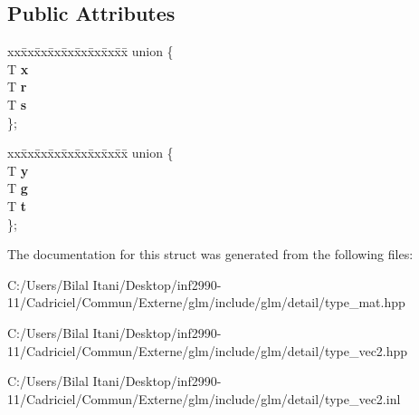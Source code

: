 \subsection*{Public Attributes}
\begin{DoxyCompactItemize}
\item 
\begin{tabbing}
xx\=xx\=xx\=xx\=xx\=xx\=xx\=xx\=xx\=\kill
union \{\\
\>T {\bfseries x}\\
\>T {\bfseries r}\\
\>T {\bfseries s}\\
\}; \hypertarget{structglm_1_1detail_1_1tvec2_afd7f3368f7e15406737f8fdcfa9a5ff3}{}\label{structglm_1_1detail_1_1tvec2_afd7f3368f7e15406737f8fdcfa9a5ff3}
\\

\end{tabbing}\item 
\begin{tabbing}
xx\=xx\=xx\=xx\=xx\=xx\=xx\=xx\=xx\=\kill
union \{\\
\>T {\bfseries y}\\
\>T {\bfseries g}\\
\>T {\bfseries t}\\
\}; \hypertarget{structglm_1_1detail_1_1tvec2_a21627d4405094fd892b5dbb0a672992c}{}\label{structglm_1_1detail_1_1tvec2_a21627d4405094fd892b5dbb0a672992c}
\\

\end{tabbing}\end{DoxyCompactItemize}


The documentation for this struct was generated from the following files\+:\begin{DoxyCompactItemize}
\item 
C\+:/\+Users/\+Bilal Itani/\+Desktop/inf2990-\/11/\+Cadriciel/\+Commun/\+Externe/glm/include/glm/detail/type\+\_\+mat.\+hpp\item 
C\+:/\+Users/\+Bilal Itani/\+Desktop/inf2990-\/11/\+Cadriciel/\+Commun/\+Externe/glm/include/glm/detail/type\+\_\+vec2.\+hpp\item 
C\+:/\+Users/\+Bilal Itani/\+Desktop/inf2990-\/11/\+Cadriciel/\+Commun/\+Externe/glm/include/glm/detail/type\+\_\+vec2.\+inl\end{DoxyCompactItemize}
